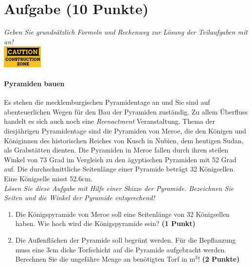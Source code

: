 \documentclass[a4paper, 10pt]{scrartcl}\usepackage[]{graphicx}\usepackage[]{xcolor}
\begin{document}
\clearpage\null

 
\clearpage

\section{Aufgabe \hfill (10 Punkte)}

\textit{Geben Sie grunds{\"a}tzlich Formeln und Rechenweg zur L{\"o}sung der
  Teilaufgaben mit an!} \\[1Ex]

\hfill\href{foo}{\includegraphics[width =
  2cm]{img/caution}} %
\hspace{2Ex}

\paragraph{Pyramiden bauen}



Es stehen die mecklemburgischen Pyramidentage an und Sie sind auf
abenteuerlichen Wegen f{\"u}r den Bau der Pyramiden zust{\"a}ndig. Zu allem
{\"U}berfluss handelt es sich auch noch eine \textit{Reenactment}
Veranstaltung. Thema der diesj{\"a}hrigen Pyramidentage sind die Pyramiden von
Meroe, die den K{\"o}nigen und K{\"o}niginnen des historischen Reiches von Kusch in
Nubien, dem heutigen Sudan, als Grabst{\"a}tten dienten. Die Pyramiden in Meroe
fallen durch ihren steilen Winkel von 73 Grad im Vergleich zu
den {\"a}gyptischen Pyramiden mit 52 Grad auf. Die durchschnittliche
Seitenl{\"a}nge einer Pyramide betr{\"a}gt 32 K{\"o}nigsellen. Eine K{\"o}nigselle
misst 52.6cm.\\

\textit{L{\"o}sen Sie diese Aufgabe mit Hilfe einer Skizze der Pyramide. Bezeichnen
  Sie Seiten und die Winkel der Pyramide entsprechend!}

\begin{enumerate}
\item Die K{\"o}nigspyramide von Meroe soll eine Seitenl{\"a}nge von 32
  K{\"o}nigsellen haben. Wie hoch wird die K{\"o}nigspyramide sein? \textbf{(1
    Punkt)}
\item Die Au{\ss}enfl{\"a}chen der Pyramide soll begr{\"u}nt werden. F{\"u}r die
  Bepflanzung muss eine 3cm dicke Torfschicht auf die
  Pyramide aufgebracht werden. Berechnen Sie die ungef{\"a}hre Menge an
  ben{\"o}tigten Torf in m$^3$! \textbf{(2 Punkte)}
\end{enumerate}
\end{document}
